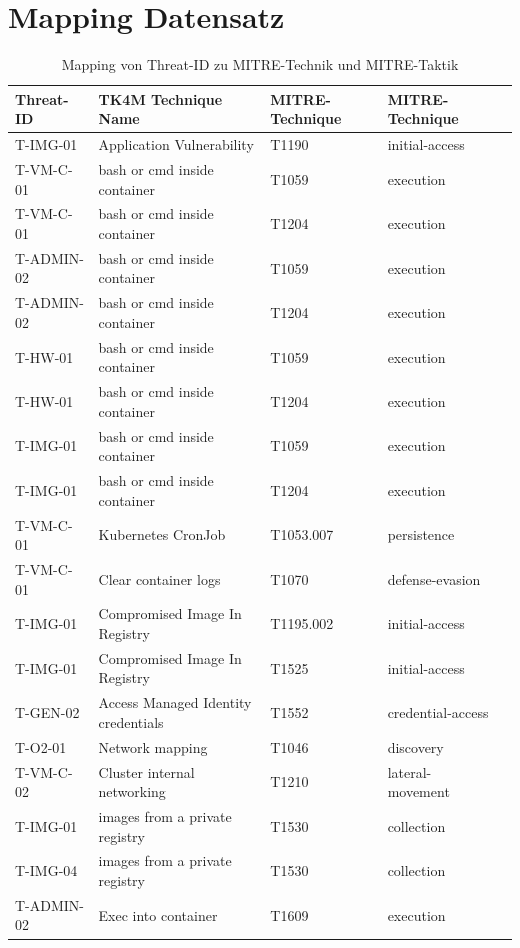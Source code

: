 \chapter{Mapping Datensatz}
\label{app:mapping-dataset}
\begin{longtable}{|l|l|l|l|l|}
    \caption{Mapping von Threat-ID zu MITRE-Technik und MITRE-Taktik}\\
    \hline
    Threat-ID & TK4M Technique Name & MITRE-Technique & MITRE-Technique \\ \hline
T-IMG-01 & Application Vulnerability & T1190 & initial-access \\ \hline
T-VM-C-01 & bash or cmd inside container & T1059 & execution \\ \hline
T-VM-C-01 & bash or cmd inside container & T1204 & execution \\ \hline
T-ADMIN-02 & bash or cmd inside container & T1059 & execution \\ \hline
T-ADMIN-02 & bash or cmd inside container & T1204 & execution \\ \hline
T-HW-01 & bash or cmd inside container & T1059 & execution \\ \hline
T-HW-01 & bash or cmd inside container & T1204 & execution \\ \hline
T-IMG-01 & bash or cmd inside container & T1059 & execution \\ \hline
T-IMG-01 & bash or cmd inside container & T1204 & execution \\ \hline
T-VM-C-01 & Kubernetes CronJob & T1053.007 & persistence \\ \hline
T-VM-C-01 & Clear container logs & T1070 & defense-evasion \\ \hline
T-IMG-01 & Compromised Image In Registry & T1195.002 & initial-access \\ \hline
T-IMG-01 & Compromised Image In Registry & T1525 & initial-access \\ \hline
T-GEN-02 & Access Managed Identity credentials & T1552 & credential-access \\ \hline
T-O2-01 & Network mapping & T1046 & discovery \\ \hline
T-VM-C-02 & Cluster internal networking & T1210 & lateral-movement \\ \hline
T-IMG-01 & images from a private registry & T1530 & collection \\ \hline
T-IMG-04 & images from a private registry & T1530 & collection \\ \hline
T-ADMIN-02 & Exec into container & T1609 & execution \\ \hline

\end{longtable}
